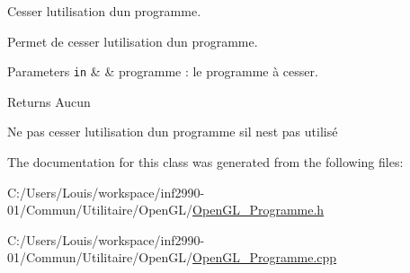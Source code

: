 Cesser l\textquotesingle{}utilisation d\textquotesingle{}un programme. 

Permet de cesser l\textquotesingle{}utilisation d\textquotesingle{}un programme.


\begin{DoxyParams}[1]{Parameters}
\mbox{\tt in}  & {\em } & programme \+: le programme à cesser.\\
\hline
\end{DoxyParams}
\begin{DoxyReturn}{Returns}
Aucun 
\end{DoxyReturn}
Ne pas cesser l\textquotesingle{}utilisation d\textquotesingle{}un programme s\textquotesingle{}il n\textquotesingle{}est pas utilisé 

The documentation for this class was generated from the following files\+:\begin{DoxyCompactItemize}
\item 
C\+:/\+Users/\+Louis/workspace/inf2990-\/01/\+Commun/\+Utilitaire/\+Open\+G\+L/\hyperlink{_open_g_l___programme_8h}{Open\+G\+L\+\_\+\+Programme.\+h}\item 
C\+:/\+Users/\+Louis/workspace/inf2990-\/01/\+Commun/\+Utilitaire/\+Open\+G\+L/\hyperlink{_open_g_l___programme_8cpp}{Open\+G\+L\+\_\+\+Programme.\+cpp}\end{DoxyCompactItemize}
